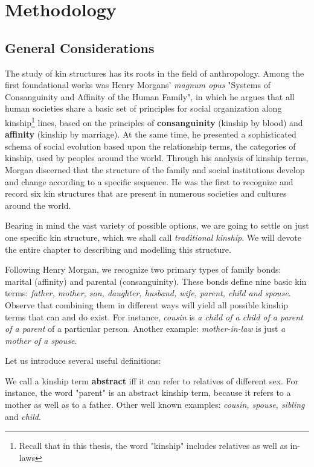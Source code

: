 \chapter{Methodology}
\label{chap:met}

\section{General Considerations}
\label{sec:general}
    The study of kin structures has its roots in the field of anthropology. Among the first foundational works was Henry Morgans'
    \textit{magnum opus} "Systems of Consanguinity and Affinity of the Human Family"\cite{morgan}, in which he argues that all human
    societies share a basic set of principles for social organization along kinship\footnote{Recall that in this thesis, the word
    "kinship" includes relatives as well as in-laws} lines, based on the principles of \textbf{consanguinity}
    (kinship by blood) and \textbf{affinity} (kinship by marriage). At the same time, he presented a sophisticated schema of social evolution
    based upon the relationship terms, the categories of kinship, used by peoples around the world. Through his analysis of kinship
    terms, Morgan discerned that the structure of the family and social institutions develop and change according to a specific
    sequence. He was the first to recognize and record six kin structures that are present in numerous societies and cultures around
    the world.

    Bearing in mind the vast variety of possible options, we are going to settle on just one specific kin structure, which we shall
    call \textit{traditional kinship}. We will devote the entire chapter to describing and modelling this structure.

    Following Henry Morgan, we recognize two primary types of family bonds: marital (affinity) and
    parental (consanguinity). These bonds define nine basic kin terms: \textit{father, mother, son, daughter, husband, wife, parent,
    child and spouse}. Observe that combining them in different ways will yield all possible kinship terms that can and do exist.
    For instance, \textit{cousin} is \textit{a child of a child of a parent of a parent} of a particular person. Another example:
    \textit{mother-in-law} is just \textit{a mother of a spouse}.

    Let us introduce several useful definitions:
    \begin{definition}
        We call a kinship term \textbf{abstract} iff it can refer to relatives of different sex. For instance, the word
        "parent" is an abstract kinship term, because it refers to a mother as well as to a father. Other well known examples:
        \textit{cousin, spouse, sibling} and \textit{child}.
    \end{definition}


